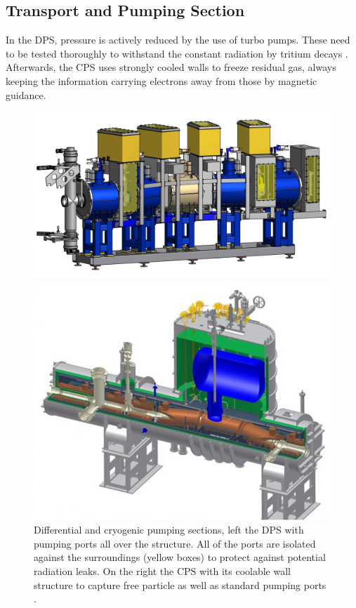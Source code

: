       
      \subsection{Transport and Pumping Section}
      
      In the DPS, pressure is actively reduced by the use of turbo pumps. These need to be tested thoroughly to withstand the constant radiation by tritium decays \cite{tritiumTests}. Afterwards, the CPS uses strongly cooled walls to freeze residual gas, always keeping the information carrying electrons away from those by magnetic guidance.
      \begin{figure}
		\begin{minipage}{0.49\textwidth}
				\includegraphics[width = 1.0\textwidth]{graphics/katrinExperiment/DPS.jpg}
		\end{minipage}
		\begin{minipage}{0.49\textwidth}
			\includegraphics[width = 1.0\textwidth]{graphics/katrinExperiment/CPS.jpg}
		\end{minipage}
		\caption[DPS and CPS]{Differential and cryogenic pumping sections, left the DPS with pumping ports all over the structure. All of the ports are isolated against the surroundings (yellow boxes) to protect against potential radiation leaks. On the right the CPS with its coolable wall structure to capture free particle as well as standard pumping ports \cite{DPS, CPS}.}
      \end{figure}
      

